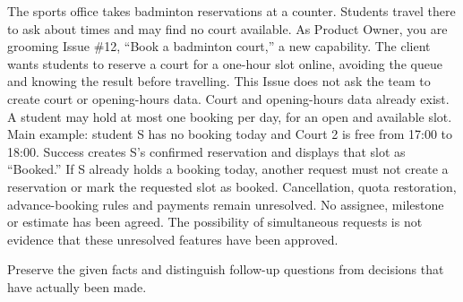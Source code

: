 \begin{contenttable}
{The sports office takes badminton reservations at a counter. Students travel there to ask about times and may find no court available. As Product Owner, you are grooming Issue \#12, “Book a badminton court,” a new capability. The client wants students to reserve a court for a one-hour slot online, avoiding the queue and knowing the result before travelling. This Issue does not ask the team to create court or opening-hours data.}
{Court and opening-hours data already exist. A student may hold at most one booking per day, for an open and available slot. Main example: student S has no booking today and Court 2 is free from 17:00 to 18:00. Success creates S’s confirmed reservation and displays that slot as “Booked.” If S already holds a booking today, another request must not create a reservation or mark the requested slot as booked.}
{Cancellation, quota restoration, advance-booking rules and payments remain unresolved. No assignee, milestone or estimate has been agreed. The possibility of simultaneous requests is not evidence that these unresolved features have been approved.}
\end{contenttable}
{Preserve the given facts and distinguish follow-up questions from decisions that have actually been made.}

